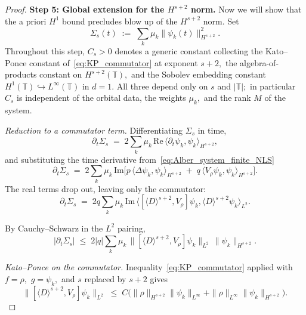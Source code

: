 \documentclass[11pt]{amsart}
\theoremstyle{definition}
\newcommand{\T}{\mathbb{T}}
\begin{document}
\begin{proof}
\smallskip

\noindent\textbf{Step 5: Global extension for the $H^{s+2}$ norm.} Now we will show that the a priori $H^1$ bound precludes blow up of the $H^{s+2}$ norm. Set
\[
  \Sigma_s(t)\;:=\;\sum_k\mu_k\|\psi_k(t)\|_{H^{s+2}}^2.
\]
Throughout this step, $C_s>0$ denotes a generic constant collecting the Kato--Ponce constant of~\eqref{eq:KP_commutator} at exponent $s+2,$ the algebra-of-products constant on $H^{s+2}(\T),$ and the Sobolev embedding constant $H^1(\T)\hookrightarrow L^\infty(\T)$ in $d=1.$ All three depend only on $s$ and $|\T|;$ in particular $C_s$ is independent of the orbital data, the weights $\mu_k,$ and the rank $M$ of the system.

\smallskip

\noindent\emph{Reduction to a commutator term.} Differentiating $\Sigma_s$ in time,
\[
  \partial_t\Sigma_s
  \;=\;2\sum_k\mu_k\,\mathrm{Re}\,\langle\partial_t\psi_k,\psi_k\rangle_{H^{s+2}},
\]
and substituting the time derivative from~\eqref{eq:Alber_system_finite_NLS} 
\begin{equation}\label{eq:Sigma_dt_split}
  \partial_t\Sigma_s
  \;=\;2\sum_k\mu_k\,\mathrm{Im}\bigl[p\,\langle\Delta\psi_k,\psi_k\rangle_{H^{s+2}}\;+\;q\,\langle V_\rho\psi_k,\psi_k\rangle_{H^{s+2}}\bigr].
\end{equation}
The real terms drop out, leaving only the commutator:
\[
  \partial_t\Sigma_s
  \;=\;2q\sum_k\mu_k\,\mathrm{Im}\,\langle[\langle D\rangle^{s+2},V_\rho]\psi_k,\langle D\rangle^{s+2}\psi_k\rangle_{L^2}.
\]

By Cauchy--Schwarz in the $L^2$ pairing,
\begin{equation}\label{eq:Sigma_dt_KP}
  |\partial_t\Sigma_s|
  \;\le\;2|q|\sum_k\mu_k\,\|[\langle D\rangle^{s+2},V_\rho]\psi_k\|_{L^2}\,\|\psi_k\|_{H^{s+2}}.
\end{equation}

\smallskip

\noindent\emph{Kato--Ponce on the commutator.} Inequality~\eqref{eq:KP_commutator} applied with $f=\rho,$ $g=\psi_k,$ and $s$ replaced by $s+2$ gives
\begin{equation}\label{eq:KP_comm_finiteNLS}
  \|[\langle D\rangle^{s+2},V_\rho]\psi_k\|_{L^2}
  \;\le\;C\bigl(\|\rho\|_{H^{s+2}}\|\psi_k\|_{L^\infty}+\|\rho\|_{L^\infty}\|\psi_k\|_{H^{s+2}}\bigr).
\end{equation}

\smallskip


\end{proof}
\end{document}
